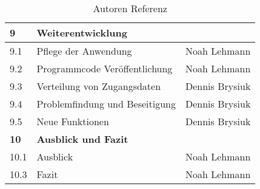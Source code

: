 \begin{table}[H]
\begin{center}
\begin{tabular}{| l | l | l |}
\hline    
\rowcolor{LGray} 						
\textbf{9} & \textbf{Weiterentwicklung}	&  				\\
\hline
9.1		& Pflege der Anwendung					& Noah Lehmann \\
\hline
9.2		& Programmcode Veröffentlichung			& Noah Lehmann \\
\hline
9.3		& Verteilung von Zugangsdaten			& Dennis Brysiuk \\
\hline
9.4		& Problemfindung und Beseitigung		& Dennis Brysiuk \\
\hline
9.5		& Neue Funktionen						& Dennis Brysiuk \\

\hline    
\rowcolor{LGray} 						
\textbf{10} & \textbf{Ausblick und Fazit} &  				\\
\hline
10.1		& Ausblick						& Noah Lehmann \\
\hline
10.3		& Fazit							& Noah Lehmann \\
\hline


\hline
  \end{tabular}
  \end{center}
\caption[Autoren Referenz]{Autoren Referenz}
\label{tab:autoren}
\end{table}


\cleardoublepage